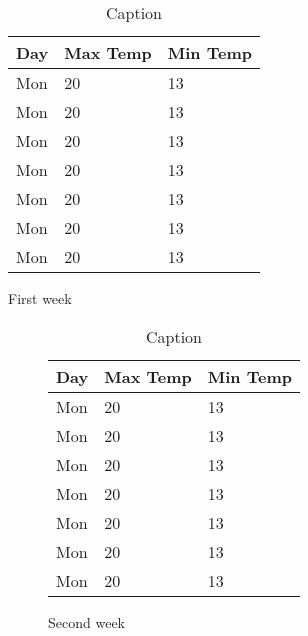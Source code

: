 \begin{table}[h]
    \begin{subtable}[h]{0.45\textwidth}
        \centering
        \begin{tabular}{l | l | l}
        Day & Max Temp & Min Temp \\
        \hline 
        Mon & 20 & 13 \\
        Mon & 20 & 13 \\
        Mon & 20 & 13 \\
        Mon & 20 & 13 \\
        Mon & 20 & 13 \\
        Mon & 20 & 13 \\
        Mon & 20 & 13 
        \end{tabular}
        \caption{First week}
        \label{tab:week1}
    \end{subtable}
    \hfill
    \begin{subfigure}[h]{0.45\textwidth}
        \centering
        \begin{tabular}{l | l | l}
        Day & Max Temp & Min Temp \\
        \hline 
        Mon & 20 & 13 \\
        Mon & 20 & 13 \\
        Mon & 20 & 13 \\
        Mon & 20 & 13 \\
        Mon & 20 & 13 \\
        Mon & 20 & 13 \\
        Mon & 20 & 13 
        \end{tabular}
        \caption{Second week}
        \label{tab:week2}
    \end{subfigure}
    \caption{Caption}
    \label{tab:two_weeks}
\end{table}